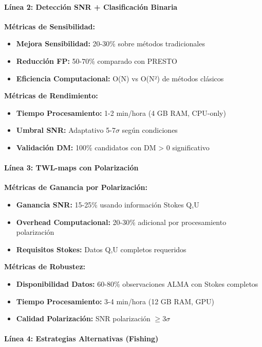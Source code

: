 \paragraph{Línea 2: Detección SNR + Clasificación Binaria}

\textbf{Métricas de Sensibilidad:}
\begin{itemize}
\item \textbf{Mejora Sensibilidad:} 20-30\% sobre métodos tradicionales
\item \textbf{Reducción FP:} 50-70\% comparado con PRESTO
\item \textbf{Eficiencia Computacional:} O(N) vs O(N²) de métodos clásicos
\end{itemize}

\textbf{Métricas de Rendimiento:}
\begin{itemize}
\item \textbf{Tiempo Procesamiento:} 1-2 min/hora (4 GB RAM, CPU-only)
\item \textbf{Umbral SNR:} Adaptativo 5-7$\sigma$ según condiciones
\item \textbf{Validación DM:} 100\% candidatos con DM > 0 significativo
\end{itemize}

\paragraph{Línea 3: TWL-maps con Polarización}

\textbf{Métricas de Ganancia por Polarización:}
\begin{itemize}
\item \textbf{Ganancia SNR:} 15-25\% usando información Stokes Q,U
\item \textbf{Overhead Computacional:} 20-30\% adicional por procesamiento polarización
\item \textbf{Requisitos Stokes:} Datos Q,U completos requeridos
\end{itemize}

\textbf{Métricas de Robustez:}
\begin{itemize}
\item \textbf{Disponibilidad Datos:} 60-80\% observaciones ALMA con Stokes completos
\item \textbf{Tiempo Procesamiento:} 3-4 min/hora (12 GB RAM, GPU)
\item \textbf{Calidad Polarización:} SNR polarización $\geq 3\sigma$
\end{itemize}

\paragraph{Línea 4: Estrategias Alternativas (Fishing)}

